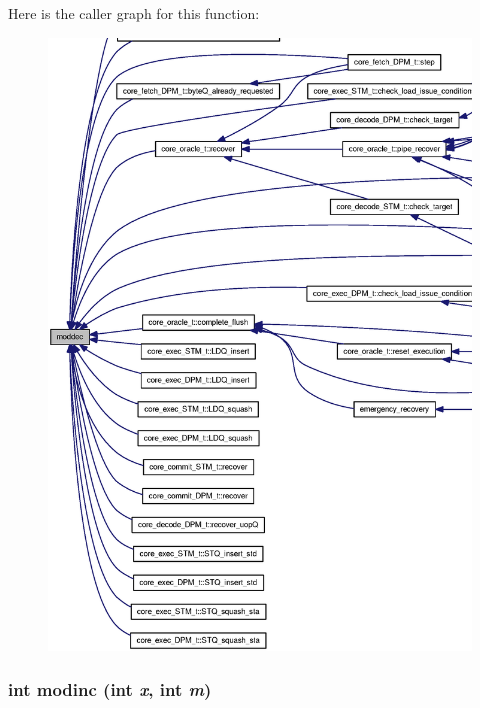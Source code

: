 Here is the caller graph for this function:\nopagebreak
\begin{figure}[H]
\begin{center}
\leavevmode
\includegraphics[width=420pt]{misc_8h_e72918bfe3eb9d02e83975f2739a7ab2_icgraph}
\end{center}
\end{figure}
\subsubsection[{modinc}]{\setlength{\rightskip}{0pt plus 5cm}int modinc (int {\em x}, \/  int {\em m})\hspace{0.3cm}{\tt  [inline]}}\label{misc_8h_ec0decc56f83415e5cd152f876e5dde1}




